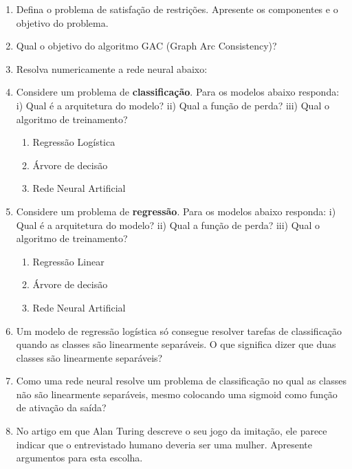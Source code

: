 \documentclass[a4paper,12pt]{exam}
\begin{document}
\begin{enumerate}
    \item Defina o problema de satisfação de restrições. Apresente os componentes e o objetivo do problema.
    
    \item Qual o objetivo do algoritmo GAC (Graph Arc Consistency)? 

    \item Resolva numericamente a rede neural abaixo:
    \clearpage
    \begin{figure}[!hb]
        
    \end{figure}
    \clearpage

    \item Considere um problema de \textbf{classificação}. Para os modelos abaixo responda: i) Qual é a arquitetura do modelo? ii) Qual a função de perda? iii) Qual o algoritmo de treinamento? 
        \begin{enumerate}
            \item Regressão Logística
            \item Árvore de decisão
            \item Rede Neural Artificial
        \end{enumerate}

    \item Considere um problema de \textbf{regressão}. Para os modelos abaixo responda: i) Qual é a arquitetura do modelo? ii) Qual a função de perda? iii) Qual o algoritmo de treinamento? 
    \begin{enumerate}
        \item Regressão Linear 
        \item Árvore de decisão
        \item Rede Neural Artificial
    \end{enumerate}

    \item Um modelo de regressão logística só consegue resolver tarefas de classificação quando as classes são linearmente separáveis. O que significa dizer que duas classes são linearmente separáveis? 

    \item Como uma rede neural resolve um problema de classificação no qual as classes não são linearmente separáveis, mesmo colocando uma sigmoid como função de ativação da saída?

    \item No artigo em que Alan Turing descreve o seu jogo da imitação, ele parece indicar que o entrevistado humano deveria ser uma mulher. Apresente argumentos para esta escolha.

\end{enumerate}
\end{document}
